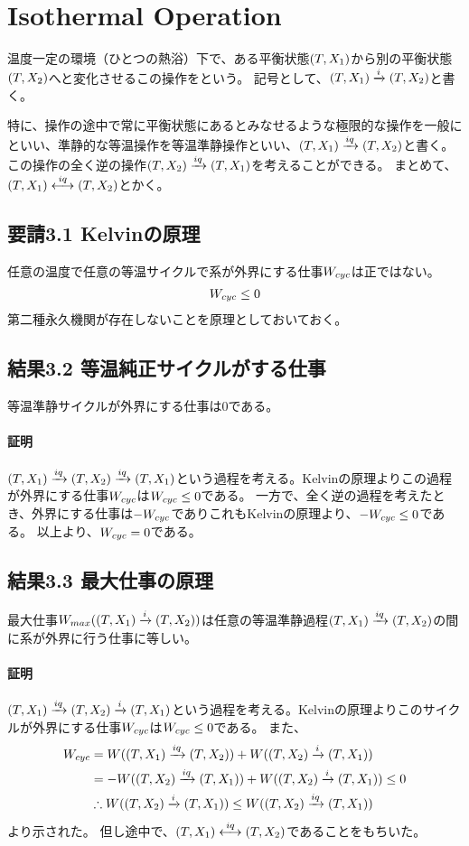 \section{Isothermal Operation}
温度一定の環境（ひとつの熱浴）下で、ある平衡状態$(T, X_1)$から別の平衡状態$(T, X_2)$へと変化させるこの操作をという。
記号として、$(T, X_1)\xrightarrow{i}(T, X_2)$と書く。

特に、操作の途中で常に平衡状態にあるとみなせるような極限的な操作を一般にといい、準静的な等温操作を等温準静操作といい、$(T, X_1)\xrightarrow{iq}(T, X_2)$と書く。
この操作の全く逆の操作$(T, X_2)\xrightarrow{iq}(T, X_1)$を考えることができる。
まとめて、$(T, X_1)\overset{iq}{\longleftrightarrow}(T, X_2)$とかく。

\subsection*{要請3.1 Kelvinの原理}
任意の温度で任意の等温サイクルで系が外界にする仕事$W_{cyc}$は正ではない。
\begin{align}\label{iso:kelvin}
  W_{cyc} \leq 0
\end{align}
第二種永久機関が存在しないことを原理としておいておく。

\subsection*{結果3.2 等温純正サイクルがする仕事}
等温準静サイクルが外界にする仕事は0である。

\paragraph*{証明}
$(T, X_1)\xrightarrow{iq}(T, X_2)\xrightarrow{iq}(T, X_1)$という過程を考える。Kelvinの原理よりこの過程が外界にする仕事$W_{cyc}$は$W_{cyc}\leq0$である。
一方で、全く逆の過程を考えたとき、外界にする仕事は$-W_{cyc}$でありこれもKelvinの原理より、$-W_{cyc}\leq0$である。
以上より、$W_{cyc}=0$である。

\subsection*{結果3.3 最大仕事の原理}
最大仕事$W_{max}((T, X_1)\xrightarrow{i}(T, X_2))$は任意の等温準静過程$(T, X_1)\xrightarrow{iq}(T, X_2)$の間に系が外界に行う仕事に等しい。

\paragraph*{証明}
$(T, X_1)\xrightarrow{iq}(T, X_2)\xrightarrow{i}(T, X_1)$という過程を考える。Kelvinの原理よりこのサイクルが外界にする仕事$W_{cyc}$は$W_{cyc}\leq0$である。
また、
\begin{align*}
  W_{cyc}&=W((T, X_1)\xrightarrow{iq}(T, X_2)) + W((T, X_2)\xrightarrow{i}(T, X_1)) \\
  &= -W((T, X_2)\xrightarrow{iq}(T, X_1)) + W((T, X_2)\xrightarrow{i}(T, X_1)) \leq 0 \\
  &\therefore W((T, X_2)\xrightarrow{i}(T, X_1)) \leq W((T, X_2)\xrightarrow{iq}(T, X_1))
\end{align*}
より示された。
但し途中で、$(T, X_1)\overset{iq}{\longleftrightarrow}(T, X_2)$であることをもちいた。


